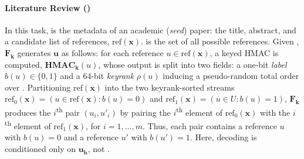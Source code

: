 
\paragraph{Literature Review (\lr)} In this task, \inp is the metadata of an academic (\emph{seed}) paper: the title, abstract, and a candidate list of references, $\text{ref}(\mathbf{x})$. \units is the set of all possible references. Given \inp, $\mathbf{F}_\mathbf{k}$ generates $\mathbf{u}$ as follows: for each reference $u \in \text{ref}(\mathbf{x})$, a keyed HMAC is computed, $\mathbf{HMAC_k}(u)$, whose output is split into two fields: a one-bit \emph{label} $b(u)\in\{0,1\}$ and a 64-bit \emph{keyrank} $\rho(u)$ inducing a pseudo-random total order over \units. Partitioning $\text{ref}(\mathbf{x})$ into the two keyrank-sorted streams $\text{ref}_0(\mathbf{x}) = (u\in \text{ref}(\mathbf{x}) : b(u)=0)$ and $\text{ref}_1(\mathbf{x}) = (u\in U : b(u)=1)$, $\mathbf{F}_\mathbf{k}$ produces the $i$\textsuperscript{th} pair $(u_i, u'_i)$ by pairing the $i$\textsuperscript{th} element of $\text{ref}_0(\mathbf{x})$ with the $i$\textsuperscript{th} element of $\text{ref}_1(\mathbf{x})$, for $i = 1, \ldots, m$. Thus, each pair contains a reference $u$ with $b(u) = 0$ and a reference $u'$ with $b(u') = 1$. Here, decoding is conditioned only on $\mathbf{u}_\mathbf{h}$, not \inp.



